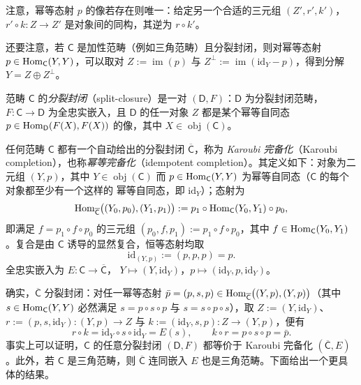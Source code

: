 注意，幂等态射 $p$ 的像若存在则唯一：给定另一个合适的三元组 $(Z',r',k')$，
$r'\circ k:Z\to Z'$ 是对象间的同构，其逆为 $r\circ k'$。

还要注意，若 $\mathsf C$ 是加性范畴（例如三角范畴）且分裂封闭，则对幂等态射
$p\in\operatorname{Hom}_{\mathsf C}(Y,Y)$，可以取对 $Z:=\operatorname{im}(p)$ 与
$Z^{\perp}:=\operatorname{im}(\mathrm{id}_Y-p)$，得到分解 $Y=Z\oplus Z^{\perp}$。

\begin{Def}\label{def:4.2}
范畴 $\mathsf C$ 的\emph{分裂封闭}（split-closure）是一对 $(\mathsf D,F)$：$\mathsf D$
为分裂封闭范畴，$F:\mathsf C\to\mathsf D$ 为全忠实嵌入，且 $\mathsf D$ 的任一对象
$Z$ 都是某个幂等自同态 $p\in\operatorname{Hom}_{\mathsf D}(F(X),F(X))$ 的像，其中
$X\in\operatorname{obj}(\mathsf C)$。
\end{Def}

\begin{Rem}\label{rem:4.3}
任何范畴 $\mathsf C$ 都有一个自动给出的分裂封闭 $\overline{\mathsf C}$，称为
\emph{Karoubi 完备化}（Karoubi completion），也称\emph{幂等完备化}（idempotent
completion）。其定义如下：对象为二元组 $(Y,p)$，其中 $Y\in\operatorname{obj}(\mathsf C)$
而 $p\in\operatorname{Hom}_{\mathsf C}(Y,Y)$ 为幂等自同态（$\mathsf C$ 的每个对象都至少有一个这样的
幂等自同态，即 $\mathrm{id}_Y$）；态射为
\[
  \operatorname{Hom}_{\overline{\mathsf C}}\bigl((Y_0,p_0),(Y_1,p_1)\bigr)
  :=p_1\circ\operatorname{Hom}_{\mathsf C}(Y_0,Y_1)\circ p_0,
\]
即满足 $f=p_1\circ f\circ p_0$ 的三元组 $(p_0,f,p_1):=p_1\circ f\circ p_0$，其中
$f\in\operatorname{Hom}_{\mathsf C}(Y_0,Y_1)$。复合是由 $\mathsf C$ 诱导的显然复合，恒等态射均取
\[
  \mathrm{id}_{(Y,p)}:=(p,p,p)=p.
\]
全忠实嵌入为 $E:\mathsf C\to\overline{\mathsf C}$，
$Y\mapsto(Y,\mathrm{id}_Y)$，$p\mapsto(\mathrm{id}_Y,p,\mathrm{id}_Y)$。

确实，$\overline{\mathsf C}$ 分裂封闭：对任一幂等态射
$\bar p=(p,s,p)\in\operatorname{Hom}_{\overline{\mathsf C}}\bigl((Y,p),(Y,p)\bigr)$（其中
$s\in\operatorname{Hom}_{\mathsf C}(Y,Y)$ 必然满足 $s=p\circ s\circ p$ 与 $s=s\circ p\circ s$），取
$Z:=(Y,\mathrm{id}_Y)$、$r:=(p,s,\mathrm{id}_Y):(Y,p)\to Z$ 与
$k:=(\mathrm{id}_Y,s,p):Z\to(Y,p)$，便有
\[
  r\circ k=\mathrm{id}_Y\circ s\circ\mathrm{id}_Y=E(s),
  \qquad
  k\circ r=p\circ s\circ p=\bar p.
\]
事实上可以证明，$\mathsf C$ 的任意分裂封闭 $(\mathsf D,F)$ 都等价于 Karoubi 完备化
$(\overline{\mathsf C},E)$。此外，若 $\mathsf C$ 是三角范畴，则 $\overline{\mathsf C}$
连同嵌入 $E$ 也是三角范畴。下面给出一个更具体的结果。
\end{Rem}


